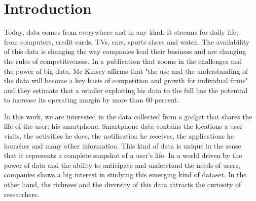 
\chapter{Introduction} %

\label{Chapter1} %




Today, data comes from everywhere and in any kind. It streams for daily life; from computers, credit cards, TVs, cars,  sports shoes and watch. The availability of this data is changing the way companies lead their business and are changing the rules of competitiveness. In a publication that zooms in the challenges and the power of big data, Mc Kinsey affirms that "the use and the understanding of the data will become a key basis of competition and growth for individual firms" and they estimate that a retailer exploiting his data to the full has the potential to increase its operating margin by more than 60 percent.\par

In this work, we are interested in the data collected from a gadget that shares the life of the user; his smartphone. Smartphone data contains the locations a user visits, the activities he does, the notification he receives, the applications he launches and many other information. This kind of data is unique in the sense that it represents a complete snapshot of a user's life. In a world driven by the power of data and the ability to anticipate and understand the needs of users, companies shows a big interest in studying this emerging kind of dataset. In the other hand, the richness  and the diversity of this data attracts the curiosity of researchers.\par

